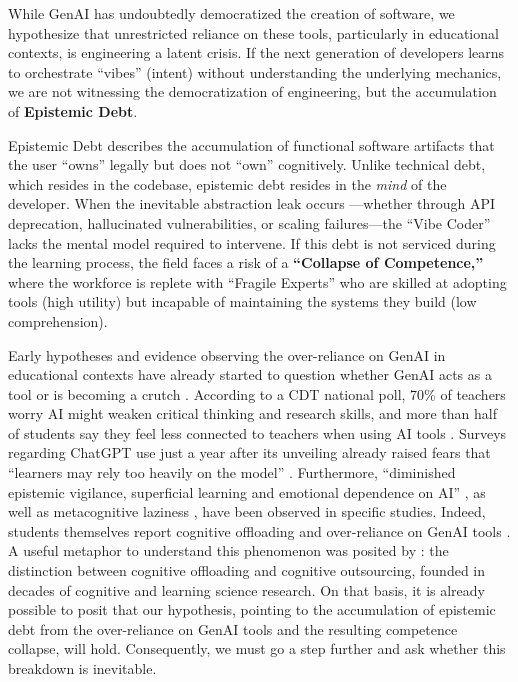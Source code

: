 \documentclass[sigconf]{acmart}
\begin{document}
While GenAI has undoubtedly democratized the creation of software, we hypothesize that unrestricted reliance on these tools, particularly in educational contexts, is engineering a latent crisis. If the next generation of developers learns to orchestrate ``vibes'' (intent) without understanding the underlying mechanics, we are not witnessing the democratization of engineering, but the accumulation of \textbf{Epistemic Debt}.

Epistemic Debt describes the accumulation of functional software artifacts that the user ``owns'' legally but does not ``own'' cognitively. Unlike technical debt, which resides in the codebase, epistemic debt resides in the \textit{mind} of the developer. When the inevitable abstraction leak occurs \cite{spolsky2002}—whether through API deprecation, hallucinated vulnerabilities, or scaling failures—the ``Vibe Coder'' lacks the mental model required to intervene. If this debt is not serviced during the learning process, the field faces a risk of a \textbf{``Collapse of Competence,''} where the workforce is replete with ``Fragile Experts'' who are skilled at adopting tools (high utility) but incapable of maintaining the systems they build (low comprehension).

Early hypotheses and evidence observing the over-reliance on GenAI in educational contexts have already started to question whether GenAI acts as a tool or is becoming a crutch \cite{balzan2026tools}. According to a CDT national poll, 70\% of teachers worry AI might weaken critical thinking and research skills, and more than half of students say they feel less connected to teachers when using AI tools \cite{laird2025hand}. Surveys regarding ChatGPT use just a year after its unveiling already raised fears that ``learners may rely too heavily on the model'' \cite{kasneci2023chatgpt}. Furthermore, ``diminished epistemic vigilance, superficial learning and emotional dependence on AI'' \cite{yan2025beyond}, as well as metacognitive laziness \cite{fan2025beware}, have been observed in specific studies. Indeed, students themselves report cognitive offloading and over-reliance on GenAI tools \cite{wei2025effects}. A useful metaphor to understand this phenomenon was posited by \citet{kirschner2026}: the distinction between cognitive offloading and cognitive outsourcing, founded in decades of cognitive and learning science research. On that basis, it is already possible to posit that our hypothesis, pointing to the accumulation of epistemic debt from the over-reliance on GenAI tools and the resulting competence collapse, will hold. Consequently, we must go a step further and ask whether this breakdown is inevitable.
\end{document}
